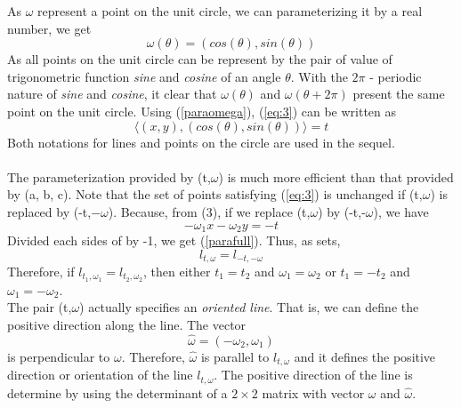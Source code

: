 \documentclass[a4paper]{article}
\begin{document}
As $\omega$ represent a point on the unit circle, we can parameterizing it by a real number, we get
\begin{equation}\label{paraomega}
    \omega(\theta) = (cos(\theta),sin(\theta))
\end{equation}
As all points on the unit circle can be represent by the pair of value of trigonometric function \textit{sine} and \textit{cosine} of an angle $\theta$. With the $2\pi$ - periodic nature of \textit{sine} and \textit{cosine}, it clear that $\omega(\theta)$ and $\omega(\theta + 2\pi)$ present the same point on the unit circle. Using (\ref{paraomega}), (\ref{eq:3}) can be written as
\begin{equation}\label{ltw}
    \langle (x,y),(cos(\theta),sin(\theta))\rangle = t
\end{equation}
Both notations for lines and points on the circle are used in the sequel.\\ \\
The parameterization provided by (t,$\omega$) is much more efficient than that provided by (a, b, c). Note that the set of points satisfying (\ref{eq:3}) is unchanged if (t,$\omega$) is replaced by (-t,$-\omega$). Because, from (3), if we replace (t,$\omega$) by (-t,-$\omega$), we have
\begin{equation}
    -\omega_1 x - \omega_2 y = -t
\end{equation}
Divided each sides of by -1, we get (\ref{parafull}). Thus, as sets,
\begin{equation}
    l_{t,\omega} = l_{-t,-\omega}
\end{equation}
Therefore, if $l_{t_1,\omega_1} = l_{t_2,\omega_2}$, then either $t_1 = t_2$ and $\omega_1 = \omega_2$ or $t_1 = -t_2$ and $\omega_1 = -\omega_2$.\\
The pair (t,$\omega$) actually specifies an \textit{oriented line}. That is, we can define the positive direction along the line. The vector
\begin{equation*}
    \hat{\omega } = (-\omega_2,\omega_1)
\end{equation*}
is perpendicular to $\omega$. Therefore, $\hat{\omega}$ is parallel to $l_{t,\omega}$ and it defines the positive direction or orientation of the line $l_{t,\omega}$. The positive direction of the line is determine by using the determinant of a $2 \times 2$ matrix with vector $\omega$ and $\hat{\omega}$.
\end{document}
